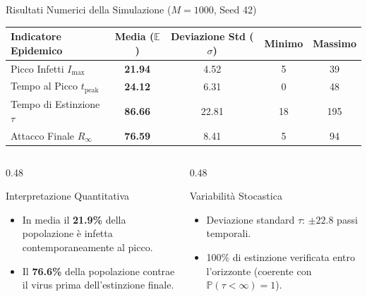 \documentclass[10pt, aspectratio=169]{beamer}
\begin{document}
\begin{frame}{Risultati Numerici della Simulazione ($M=1000$, Seed 42)}
    \begin{center}
    \begin{tabular}{lcccc}
    \toprule
    \textbf{Indicatore Epidemico} & \textbf{Media ($\mathbb{E}$)} & \textbf{Deviazione Std ($\sigma$)} & \textbf{Minimo} & \textbf{Massimo} \\
    \midrule
    Picco Infetti $I_{\max}$ & \textbf{21.94} & 4.52 & 5 & 39 \\
    Tempo al Picco $t_{\text{peak}}$ & \textbf{24.12} & 6.31 & 0 & 48 \\
    Tempo di Estinzione $\tau$ & \textbf{86.66} & 22.81 & 18 & 195 \\
    Attacco Finale $R_\infty$ & \textbf{76.59} & 8.41 & 5 & 94 \\
    \bottomrule
    \end{tabular}
    \end{center}

    \vspace{0.3cm}
    \begin{columns}[T]
        \begin{column}{0.48\textwidth}
            \begin{block}{Interpretazione Quantitativa}
                \begin{itemize}
                    \item In media il \textbf{21.9\%} della popolazione è infetta contemporaneamente al picco.
                    \item Il \textbf{76.6\%} della popolazione contrae il virus prima dell'estinzione finale.
                \end{itemize}
            \end{block}
        \end{column}
        \begin{column}{0.48\textwidth}
            \begin{block}{Variabilità Stocastica}
                \begin{itemize}
                    \item Deviazione standard $\tau$: $\pm 22.8$ passi temporali.
                    \item 100\% di estinzione verificata entro l'orizzonte (coerente con $\mathbb{P}(\tau < \infty)=1$).
                \end{itemize}
            \end{block}
        \end{column}
    \end{columns}

\end{frame}
\end{document}
